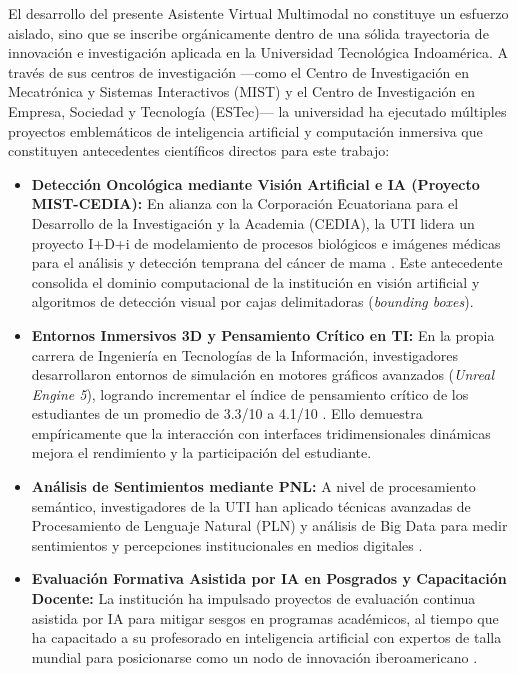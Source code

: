 El desarrollo del presente Asistente Virtual Multimodal no constituye un esfuerzo aislado, sino que se inscribe orgánicamente dentro de una sólida trayectoria de innovación e investigación aplicada en la Universidad Tecnológica Indoamérica. A través de sus centros de investigación —como el Centro de Investigación en Mecatrónica y Sistemas Interactivos (MIST) y el Centro de Investigación en Empresa, Sociedad y Tecnología (ESTec)— la universidad ha ejecutado múltiples proyectos emblemáticos de inteligencia artificial y computación inmersiva que constituyen antecedentes científicos directos para este trabajo:

\begin{itemize}
    \item \textbf{Detección Oncológica mediante Visión Artificial e IA (Proyecto MIST-CEDIA):} En alianza con la Corporación Ecuatoriana para el Desarrollo de la Investigación y la Academia (CEDIA), la UTI lidera un proyecto I+D+i de modelamiento de procesos biológicos e imágenes médicas para el análisis y detección temprana del cáncer de mama \cite{uti2025cedia}. Este antecedente consolida el dominio computacional de la institución en visión artificial y algoritmos de detección visual por cajas delimitadoras (\textit{bounding boxes}).
    \item \textbf{Entornos Inmersivos 3D y Pensamiento Crítico en TI:} En la propia carrera de Ingeniería en Tecnologías de la Información, investigadores desarrollaron entornos de simulación en motores gráficos avanzados (\textit{Unreal Engine 5}), logrando incrementar el índice de pensamiento crítico de los estudiantes de un promedio de 3.3/10 a 4.1/10 \cite{uti2024unreal}. Ello demuestra empíricamente que la interacción con interfaces tridimensionales dinámicas mejora el rendimiento y la participación del estudiante.
    \item \textbf{Análisis de Sentimientos mediante PNL:} A nivel de procesamiento semántico, investigadores de la UTI han aplicado técnicas avanzadas de Procesamiento de Lenguaje Natural (PLN) y análisis de Big Data para medir sentimientos y percepciones institucionales en medios digitales \cite{uti2024pln}.
    \item \textbf{Evaluación Formativa Asistida por IA en Posgrados y Capacitación Docente:} La institución ha impulsado proyectos de evaluación continua asistida por IA para mitigar sesgos en programas académicos, al tiempo que ha capacitado a su profesorado en inteligencia artificial con expertos de talla mundial para posicionarse como un nodo de innovación iberoamericano \cite{uti2025rc}.
\end{itemize}

